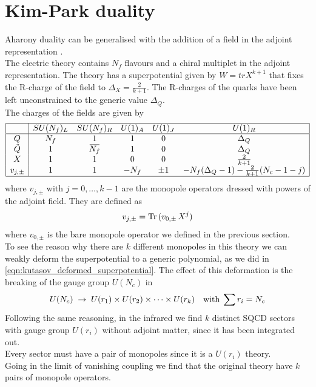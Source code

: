 \section{Kim-Park duality}
Aharony duality can be generalised with the addition of a field in the adjoint representation \cite{Kim:2013cma}.\\
The electric theory contains $N_f$ flavours and a chiral multiplet in the adjoint representation. 
The theory has a superpotential given by $W = tr X^{k+1}$ that fixes the R-charge of the field to $\Delta_X = \frac{2}{k+1}$.
The R-charges of the quarks have been left unconstrained to the generic value $\Delta_Q$.\\
The charges of the fields are given by
\begin{equation}
\begin{array}{ | c | c c c c c |}
\hline
  & SU(N_f)_L & SU(N_f)_R & U(1)_A & U(1)_J  & U(1)_R   \\
 \hline
 Q & N_f & 1& 1 & 0   & \Delta_Q  \\  
 \tilde{Q} & 1 & \overbar{N_f} & 1 & 0 & \Delta_Q      \\  
  X & 1 & 1  & 0 & 0 & \frac{2}{k+1}  \\ 
 v_{j,\pm} & 1  &1   & - N_f & \pm 1 & -N_f (\Delta_Q-1 ) - \frac{2}{k+1} (N_c-1 - j) \\
 \hline
\end{array}
\end{equation}
where $v_{j,\pm}$ with $j=0,\dotsc,k-1$ are the monopole operators dressed with powers of the adjoint field. 
They are defined as \cite{Kim:2013cma}
\begin{equation}
v_{j,\pm} = \mathrm{Tr } \,{( v_{0,\pm} \, X^{j})}
\label{eqn:3d_mag_monopoles_def}
\end{equation}
where $v_{0,\pm}$ is the bare monopole operator we defined in the previous section.\\
To see the reason why there are $k$ different monopoles in this theory we can weakly deform the superpotential to a generic polynomial, as we did in \eqref{eqn:kutasov_deformed_superpotential}.
The effect of this deformation is the breaking of the gauge group $U(N_c)$ in 
\begin{equation}
U(N_c) \; \rightarrow \; U(r_1) \times U(r_2) \times \dots \times U(r_k) \quad \hbox{with} \; \sum r_i = N_c
\end{equation}
Following the same reasoning, in the infrared we find $k$ distinct SQCD sectors with gauge group $U(r_i)$ without adjoint matter, since it has been integrated out.\\
Every sector must have a pair of monopoles since it is a $U(r_i)$ theory.\\
Going in the limit of vanishing coupling we find that the original theory have $k$ pairs of monopole operators.\\


